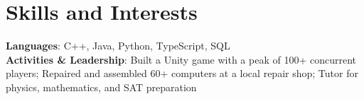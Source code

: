 \documentclass[letterpaper,11pt]{article}
\begin{document}
\section{Skills and Interests}
 \begin{itemize}[leftmargin=0.15in, label={}]
    \small{\item{
     \textbf{Languages}{: C++, Java, Python, TypeScript, SQL} \\
     \textbf{Activities \& Leadership}{: Built a Unity game with a peak of 100+ concurrent players; Repaired and assembled 60+ computers at a local repair shop; Tutor for physics, mathematics, and SAT preparation}
    }}
 \end{itemize}
\end{document}
